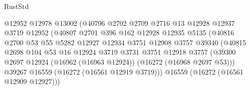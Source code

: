 \begin{lexlean}{RustStd}
\begin{coremodule}
                                      @12952
                                      @12978
                                      @13002
                                      (@40796
                                        @2702
                                        @2709
                                        @2716
                                        @13
                                        @12928
                                        @12937
                                        @3719
                                        @12952
                                        (@40807
                                          @2701
                                          @396
                                          @162
                                          @12928
                                          @12935
                                          @5135
                                          (@40816
                                            @2700
                                            @53
                                            @55
                                            @5282
                                            @12927
                                            @12934
                                            @3751
                                            @12908
                                            @3757
                                            @39340
                                            (@40815
                                              @2698
                                              @104
                                              @53
                                              @16
                                              @12924
                                              @3719
                                              @3731
                                              @3751
                                              @12918
                                              @3757
                                              (@39300
                                                @2697
                                                @12924
                                                (@16962 (@16963 @12924))
                                                (@16272 (@16968 @2697 @53)))
                                              @39267
                                              @16559
                                              (@16272 (@16561 @12919 @3719)))
                                            @16559
                                            (@16272 (@16561 @12909 @12927)))

\end{coremodule}
\end{lexlean}
